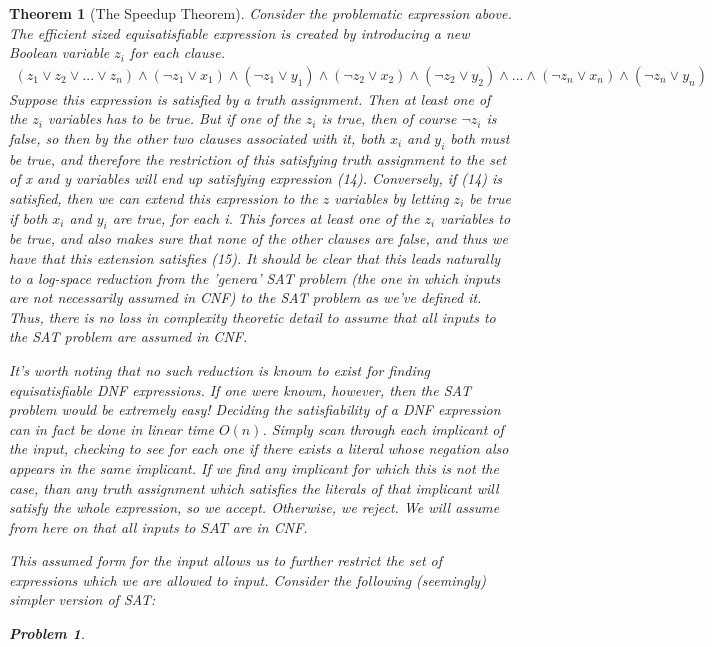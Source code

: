 \documentclass{article}
\theoremstyle{definition}
\newtheorem{problem}{Problem}
\theoremstyle{plain}
\theoremstyle{theorem}
\newtheorem{theorem}{Theorem}[section]
\begin{document}
\begin{theorem}[The Speedup Theorem]
\par Consider the problematic expression above. The efficient sized equisatisfiable expression is created by introducing a new Boolean variable $z_i$ for each clause.
\begin{align}
    (z_1 \vee z_2 \vee ... \vee z_n) \wedge (\neg z_1 \vee x_1) \wedge (\neg z_1 \vee y_1) \wedge (\neg z_2 \vee x_2) \wedge (\neg z_2 \vee y_2) \wedge ... \wedge (\neg z_n \vee x_n) \wedge (\neg z_n \vee y_n)
\end{align}
Suppose this expression is satisfied by a truth assignment. Then at least one of the $z_i$ variables has to be true. But if one of the $z_i$ is true, then of course $\neg z_i$ is false, so then by the other two clauses associated with it, both $x_i$ and $y_i$ both must be true, and therefore the restriction of this satisfying truth assignment to the set of x and y variables will end up satisfying expression (14). Conversely, if (14) is satisfied, then we can extend this expression to the $z$ variables by letting $z_i$ be true if both $x_i$ and $y_i$ are true, for each i. This forces at least one of the $z_i$ variables to be true, and also makes sure that none of the other clauses are false, and thus we have that this extension satisfies (15). It should be clear that this leads naturally to a log-space reduction from the 'genera' SAT problem (the one in which inputs are not necessarily assumed in CNF) to the SAT problem as we've defined it. Thus, there is no loss in complexity theoretic detail to assume that all inputs to the SAT problem are assumed in CNF. 
\par It's worth noting that no such reduction is known to exist for finding equisatisfiable DNF expressions. If one were known, however, then the SAT problem would be extremely easy! Deciding the satisfiability of a DNF expression can in fact be done in linear time $O(n)$. Simply scan through each implicant of the input, checking to see for each one if there exists a literal whose negation also appears in the same implicant. If we find any implicant for which this is not the case, than any truth assignment which satisfies the literals of that implicant will satisfy the whole expression, so we accept. Otherwise, we reject. We will assume from here on that all inputs to $SAT$ are in CNF.
\par This assumed form for the input allows us to further restrict the set of expressions which we are allowed to input. Consider the following (seemingly) simpler version of SAT:
\begin{problem} 

\end{problem}
\end{theorem}
\end{document}

